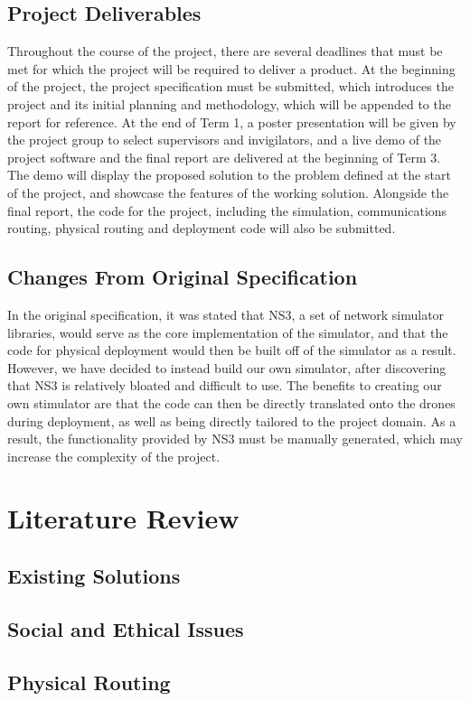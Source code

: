 \documentclass[12pt,a4paper,twoside]{report}
\begin{document}
	\section{Project Deliverables}
	Throughout the course of the project, there are several deadlines that must be met for which the project will be required to deliver a product. At the beginning of the project, the project specification must be submitted, which introduces the project and its initial planning and methodology, which will be appended to the report for reference. At the end of Term 1, a poster presentation will be given by the project group to select supervisors and invigilators, and a live demo of the project software and the final report are delivered at the beginning of Term 3. The demo will display the proposed solution to the problem defined at the start of the project, and showcase the features of the working solution. Alongside the final report, the code for the project, including the simulation, communications routing, physical routing and deployment code will also be submitted.
	\section{Changes From Original Specification}
	In the original specification, it was stated that NS3, a set of network simulator libraries, would serve as the core implementation of the simulator, and that the code for physical deployment would then be built off of the simulator as a result. However, we have decided to instead build our own simulator, after discovering that NS3 is relatively bloated and difficult to use. The benefits to creating our own stimulator are that the code can then be directly translated onto the drones during deployment, as well as being directly tailored to the project domain. As a result, the functionality provided by NS3 must be manually generated, which may increase the complexity of the project. 


\chapter{Literature Review}
	\section{Existing Solutions}
	\section{Social and Ethical Issues}
	\section{Physical Routing}
\end{document}
